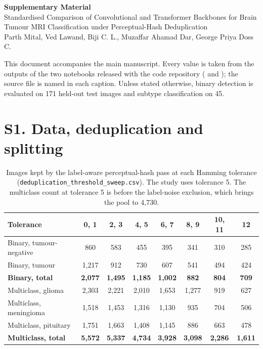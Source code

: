 \documentclass[11pt]{article}
\begin{document}
\begin{center}
{\Large\bfseries Supplementary Material}\\[6pt]
{\large Standardised Comparison of Convolutional and Transformer Backbones for Brain Tumour MRI Classification under Perceptual-Hash Deduplication}\\[6pt]
Parth Mital, Ved Lawand, Biji C. L., Muzaffar Ahamad Dar, George Priya Doss C.
\end{center}

This document accompanies the main manuscript. Every value is taken from the outputs of the two notebooks released with the code repository ( and ); the source file is named in each caption. Unless stated otherwise, binary detection is evaluated on 171 held-out test images and subtype classification on 45.

\section*{S1. Data, deduplication and splitting}

\begin{table}[htbp]
\centering
\caption{Images kept by the label-aware perceptual-hash pass at each Hamming tolerance (\texttt{deduplication\_threshold\_sweep.csv}). The study uses tolerance 5. The multiclass count at tolerance 5 is before the label-noise exclusion, which brings the pool to 4,730.}
\small
\begin{tabular*}{\textwidth}{@{\extracolsep{\fill}}lccccccc@{}}
\toprule
Tolerance & 0, 1 & 2, 3 & 4, 5 & 6, 7 & 8, 9 & 10, 11 & 12 \\
\midrule
Binary, tumour-negative & 860 & 583 & 455 & 395 & 341 & 310 & 285 \\
Binary, tumour & 1,217 & 912 & 730 & 607 & 541 & 494 & 424 \\
\textbf{Binary, total} & \textbf{2,077} & \textbf{1,495} & \textbf{1,185} & \textbf{1,002} & \textbf{882} & \textbf{804} & \textbf{709} \\
\midrule
Multiclass, glioma & 2,303 & 2,221 & 2,010 & 1,653 & 1,277 & 919 & 627 \\
Multiclass, meningioma & 1,518 & 1,453 & 1,316 & 1,130 & 935 & 704 & 506 \\
Multiclass, pituitary & 1,751 & 1,663 & 1,408 & 1,145 & 886 & 663 & 478 \\
\textbf{Multiclass, total} & \textbf{5,572} & \textbf{5,337} & \textbf{4,734} & \textbf{3,928} & \textbf{3,098} & \textbf{2,286} & \textbf{1,611} \\
\bottomrule
\end{tabular*}
\end{table}
\end{document}
